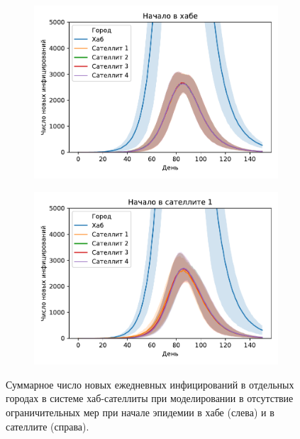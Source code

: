 \documentclass[a4paper,12pt]{article} %
\begin{document}
\begin{figure}[H]
    \centering
    \begin{subfigure}{0.45\linewidth}
        \centering
        \includegraphics[width=\linewidth]{images/satellites_epids0.pdf}
    \end{subfigure}
    \hfill
    \begin{subfigure}{0.45\linewidth}
        \centering
        \includegraphics[width=\linewidth]{images/satellites_epids1.pdf}
    \end{subfigure}
    \caption{Суммарное число новых ежедневных инфицирований в отдельных городах в системе хаб-сателлиты при моделировании в отсутствие ограничительных мер при начале эпидемии в хабе (слева) и в сателлите (справа).}
    \label{pic:satellites_epids0}
\end{figure}
\end{document}
